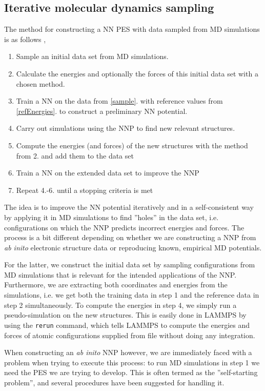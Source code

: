 \documentclass[twoside,english]{uiofysmaster}
\begin{document}
\subsection{Iterative molecular dynamics sampling}
The method for constructing a NN PES with data sampled from MD simulations is as follows \cite{Behler11general}
\cite{Behler15},
\begin{enumerate} \label{NNPalgorithm}
 \item Sample an initial data set from MD simulations. \label{sample} 
 \item Calculate the energies and optionally the forces of this initial data set with a chosen method. \label{refEnergies}
 \item Train a NN on the data from \ref{sample}. with reference values from \ref{refEnergies}. to
 construct a preliminary NN potential.
 \item Carry out simulations using the NNP to find new relevant structures. 
 \item Compute the energies (and forces) of the new structures with the method from 2. and add them to the data set
 \item Train a NN on the extended data set to improve the NNP
 \item Repeat 4.-6. until a stopping criteria is met
\end{enumerate}
The idea is to improve the NN potential iteratively and in a self-consistent 
way by applying it in MD simulations to find 
''holes'' in the data set, i.e. configurations on which the NNP predicts incorrect energies and forces. The process
is a bit different depending on whether we are constructing a NNP from \textit{ab inito} electronic structure data
or reproducing known, empirical MD potentials. 

For the latter, we construct the initial data set by sampling configurations from MD simulations that is relevant
for the intended applications of the NNP. Furthermore, we are extracting both coordinates and energies from the simulations, i.e.
we get both the training data in step 1 and the reference data in step 2 simultaneously. To compute the energies in
step 4, we simply run a pseudo-simulation on the new structures. This is easily done in LAMMPS by using 
the \texttt{rerun} command, which tells LAMMPS to compute the energies and forces of atomic configurations 
supplied from file without doing any integration. 

When constructing an \textit{ab inito} NNP however, we are immediately faced with a problem when trying to execute this process: 
to run MD simulations in step 1 we need the PES we are trying to develop. 
This is often termed as the ''self-starting problem'', 
and several procedures have been suggested for handling it. 
\end{document}
